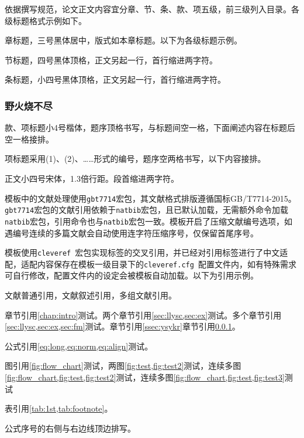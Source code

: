 \label{sec:fm}
依据撰写规范，论文正文内容宜分章、节、条、款、项五级，前三级列入目录。各级标题格式示例如下。

章标题，三号黑体居中，版式如本章标题。以下为各级标题示例。

\label{sec:llysc}
节标题，四号黑体顶格，正文另起一行，首行缩进两字符。

\label{ssec:ysykr}
条标题，小四号黑体顶格，正文另起一行，首行缩进两字符。
\subsubsection{野火烧不尽}\label{sssec:yhsbj}
款、项标题小4号楷体，题序顶格书写，与标题间空一格，下面阐述内容在标题后空一格接排。

项标题采用(1)、(2)、……形式的编号，题序空两格书写，以下内容接排。

正文小四号宋体，1.3倍行距。段首缩进两字符。

\label{sec:ex}
模板中的文献处理使用\verb|gbt7714|宏包，其文献格式排版遵循国标GB/T7714-2015。\verb|gbt7714|宏包的文献引用依赖于\verb|natbib|宏包，且已默认加载，无需额外命令加载\verb|natbib|宏包，引用命令也与\verb|natbib|宏包一致。模板开启了压缩文献编号选项，如遇编号连续的多篇文献会自动使用连字符压缩序号，仅保留首尾序号。

模板使用\verb|cleveref|~宏包实现标签的交叉引用，并已经对引用标签进行了中文适配，适配内容保存在模板一级目录下的\verb|cleveref.cfg|~配置文件内，如有特殊需求可自行修改，配置文件内的设定会被模板自动加载。以下为引用示例。

文献普通引用\cite{同鸣2012}，文献叙述引用\citet{Boutsidis2011}，多组文献引用\cite{同鸣2012, Lee1999, Tang2013, Ding2006Orthogonal}。

章节引用\cref{chap:intro}测试。两个章节引用\cref{sec:llysc,sec:ex}测试。多个章节引用\cref{sec:llysc,sec:ex,sec:fm}测试。章节引用\cref{ssec:ysykr}章节引用\cref{sssec:yhsbj}。

公式引用\cref{eq:long,eq:norm,eq:align}测试。

图引用\cref{fig:flow_chart}测试，两图\cref{fig:test,fig:test2}测试，连续多图\cref{fig:flow_chart,fig:test,fig:test2}测试，连续多图\cref{fig:flow_chart,fig:test,fig:test3}测试

表引用\cref{tab:1st,tab:footnote}。

公式序号的右侧与右边线顶边排写。

